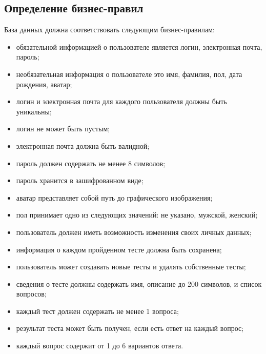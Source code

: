 \subsection{Определение бизнес-правил }
База данных должна соответствовать следующим бизнес-правилам:
\begin{itemize}
	\item обязательной информацией о пользователе является логин, электронная почта, пароль;
	\item необязательная информация о пользователе это имя, фамилия, пол, дата рождения, аватар;
	\item логин и электронная почта для каждого пользователя должны быть уникальны;
	\item логин не может быть пустым;
	\item электронная почта должна быть валидной;
	\item пароль должен содержать не менее 8 символов;
	\item пароль хранится в зашифрованном виде;
	\item аватар представляет собой путь до графического изображения;
	\item пол принимает одно из следующих значений: не указано, мужской, женский;
	\item пользователь должен иметь возможность изменения своих личных данных;
	\item информация о каждом пройденном тесте должна быть сохранена;
	\item пользователь может создавать новые тесты и удалять собственные тесты;
	\item сведения о тесте должны содержать имя, описание до 200 символов, и список вопросов;
	\item каждый тест должен содержать не менее 1 вопроса;
	\item результат теста может быть получен, если есть ответ на каждый вопрос;
	\item каждый вопрос содержит от 1 до 6 вариантов ответа.
\end{itemize}

